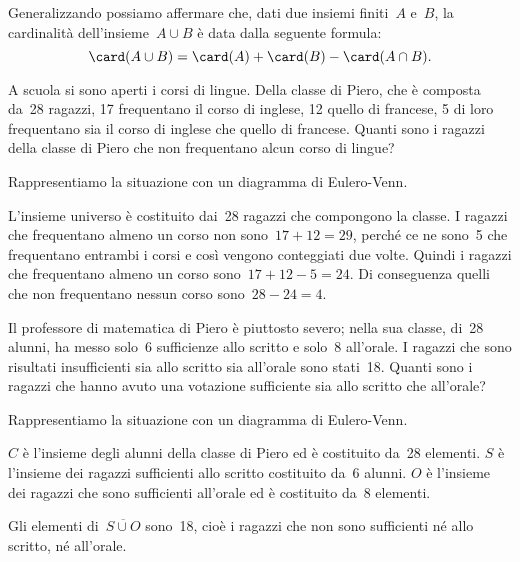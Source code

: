 \begin{exrig}
\begin{esempio}
Generalizzando possiamo affermare che, dati due insiemi finiti~$A$ e~$B$, la cardinalità dell'insieme~$A\cup B$ è data dalla seguente formula:
\[\card(A\cup B)=\card(A)+\card(B)-\card(A\cap B).\]
\end{esempio}

\begin{esempio}
 A scuola si sono aperti i corsi di lingue. Della classe di Piero, che è composta da~28 ragazzi, 17 frequentano il corso di inglese, 12
quello di francese, 5 di loro frequentano sia il corso di inglese che quello di francese. Quanti sono i ragazzi della classe di Piero che non
frequentano alcun corso di lingue?

Rappresentiamo la situazione con un diagramma di Eulero-Venn.
\begin{multicols}{2}
L'insieme universo è costituito dai~28 ragazzi che
compongono la classe. I ragazzi che frequentano almeno un corso non sono~$17+12=29$, perché ce ne sono~5 che frequentano entrambi i corsi e così
vengono conteggiati due volte. Quindi i ragazzi che frequentano almeno un corso sono~$17+12-5=24$. Di conseguenza quelli che non frequentano
nessun corso sono~$28-24=4$.
\begin{center}
 
\end{center}
\end{multicols}
\end{esempio}

\begin{esempio}
 Il professore di matematica di Piero è piuttosto severo; nella sua classe, di~28 alunni, ha messo solo~6 sufficienze allo scritto e solo~8
all'orale. I ragazzi che sono risultati insufficienti sia allo scritto sia all'orale sono stati~18. Quanti
sono i ragazzi che hanno avuto una votazione sufficiente sia allo scritto che all'orale?

Rappresentiamo la situazione con un diagramma di Eulero-Venn.
\begin{multicols}{2}
$C$ è l'insieme degli alunni della classe di Piero ed è costituito da~28 elementi. $S$ è l'insieme dei ragazzi
sufficienti allo scritto costituito da~6 alunni. $O$ è l'insieme dei ragazzi che sono sufficienti
all'orale ed è costituito da~8 elementi.

Gli elementi di~$\overline{S\cup O}$ sono~18, cioè i ragazzi che
non sono sufficienti né allo scritto, né all'orale.
\begin{center}
 
\end{center}
\end{multicols}


\end{esempio}
\end{exrig}
